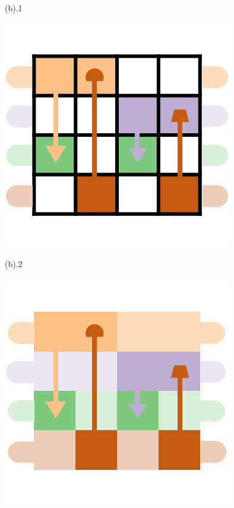 \begin{figure}[h]
\begin{minipage}{0.24\linewidth}
		\vspace{-1pt}
		\centerline{(b).1}
		\centerline{\includegraphics[width=\textwidth]{Fig/22.png}}
		\vspace{-1pt}
		\centerline{(b).2}
		\centerline{\includegraphics[width=\textwidth]{Fig/23.png}}

\end{minipage}
\end{figure}
